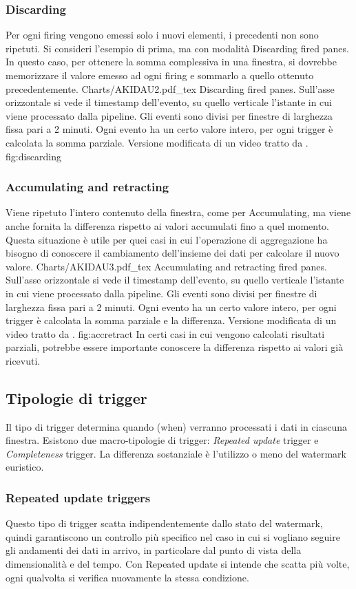 \subsubsection{Discarding}
Per ogni firing vengono emessi solo i nuovi elementi, i precedenti non sono ripetuti. Si consideri l’esempio di prima, ma con modalità Discarding fired panes. In questo caso, per ottenere la somma complessiva in una finestra, si dovrebbe memorizzare il valore emesso ad ogni firing e sommarlo a quello ottenuto precedentemente.
\svg
{Charts/AKIDAU2.pdf_tex}
{Discarding fired panes.  Sull'asse orizzontale si vede il timestamp dell'evento, su quello verticale l'istante in cui viene processato dalla pipeline. Gli eventi sono divisi per finestre di larghezza fissa pari a 2 minuti. Ogni evento ha un certo valore intero, per ogni trigger è calcolata la somma parziale. Versione modificata di un video tratto da  \cite{akidau_chernyak_lax_2018}.}
{fig:discarding}
\subsubsection{Accumulating and retracting}
Viene ripetuto l’intero contenuto della finestra, come per Accumulating, ma viene anche fornita la differenza rispetto ai valori accumulati fino a quel momento. Questa situazione è utile per quei casi in cui l’operazione di aggregazione ha bisogno di conoscere il cambiamento dell’insieme dei dati per calcolare il nuovo valore.
\svg
{Charts/AKIDAU3.pdf_tex}
{Accumulating and retracting fired panes.  Sull'asse orizzontale si vede il timestamp dell'evento, su quello verticale l'istante in cui viene processato dalla pipeline. Gli eventi sono divisi per finestre di larghezza fissa pari a 2 minuti. Ogni evento ha un certo valore intero, per ogni trigger è calcolata la somma parziale e la differenza. Versione modificata di un video tratto da  \cite{akidau_chernyak_lax_2018}. }
{fig:accretract}
In certi casi in cui vengono calcolati risultati parziali, potrebbe essere importante conoscere la differenza rispetto ai valori già ricevuti.
\subsection{Tipologie di trigger}
Il tipo di trigger determina quando (when) verranno processati i dati in ciascuna finestra. Esistono due macro-tipologie di trigger: \textit{Repeated update} trigger e \textit{Completeness} trigger. La differenza sostanziale è l’utilizzo o meno del watermark euristico.
\subsubsection{Repeated update triggers}
Questo tipo di trigger scatta indipendentemente dallo stato del watermark, quindi garantiscono un controllo più specifico nel caso in cui si vogliano seguire gli andamenti dei dati in arrivo, in particolare dal punto di vista della dimensionalità e del tempo. Con Repeated update si intende che scatta più volte, ogni qualvolta si verifica nuovamente la stessa condizione.

